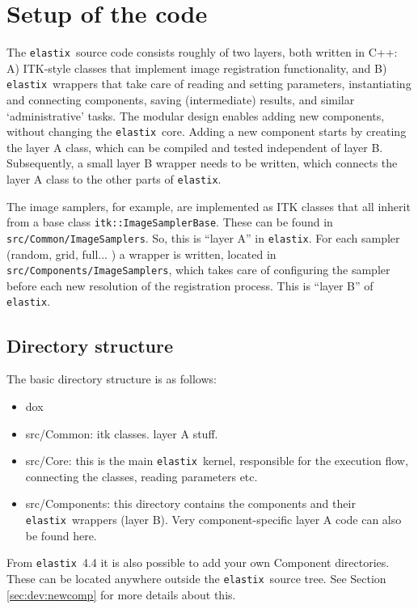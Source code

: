 \documentclass[]{report}
\newcommand{\elastix}{\texttt{elastix}}
\begin{document}
%
\section{Setup of the code}

The \elastix\ source code consists roughly of two layers, both
written in C++: A) ITK-style classes that implement image
registration functionality, and B) \elastix\ wrappers that take care
of reading and setting parameters, instantiating and connecting
components, saving (intermediate) results, and similar
`administrative' tasks. The modular design enables adding new
components, without changing the \elastix\ core. Adding a new
component starts by creating the layer A class, which can be
compiled and tested independent of layer B. Subsequently, a small
layer B wrapper needs to be written, which connects the layer A
class to the other parts of \elastix.

The image samplers, for example, are implemented as ITK classes that
all inherit from a base class \texttt{itk::ImageSamplerBase}. These
can be found in \texttt{src/Common/ImageSamplers}. So, this is
``layer A'' in \elastix. For each sampler (random, grid, full... ) a
wrapper is written, located in
\texttt{src/Components/ImageSamplers}, which takes care of
configuring the sampler before each new resolution of the
registration process. This is ``layer B'' of \elastix.

\subsection{Directory structure}

The basic directory structure is as follows:
\begin{itemize}
\item dox
\item src/Common: itk classes. layer A stuff.
\item src/Core: this is the main \elastix\ kernel, responsible for the
    execution flow, connecting the classes, reading parameters etc.
\item src/Components: this directory contains the components and their
    \elastix\ wrappers (layer B). Very component-specific layer A code can
    also be found here.
\end{itemize}

From \elastix\ 4.4 it is also possible to add your own Component directories.
These can be located anywhere outside the \elastix\ source tree. See Section
\ref{sec:dev:newcomp} for more details about this.
\end{document}
